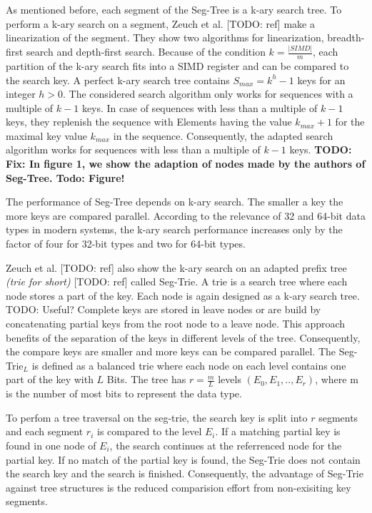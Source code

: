 \documentclass[conference]{IEEEtran}
\begin{document}
As mentioned before, each segment of the Seg-Tree is a k-ary search tree. To perform a k-ary search on a segment, Zeuch et al. [TODO: ref] make a linearization of the segment. They show two algorithms for linearization, breadth-first search and depth-first search. Because of the condition $k = \frac{\vert SIMD \vert }{m}$, each partition of the k-ary search fits into a SIMD register and can be compared to the search key. A perfect k-ary search tree contains  $S_{max} = k^h - 1$ keys for an integer $h > 0$. The considered search algorithm only works for sequences with a multiple of $k-1$ keys. In case of  sequences with less than a multiple of $k-1$ keys, they replenish the sequence with Elements having the value $k_{max} + 1$ for the maximal key value $k_{max}$ in the sequence. Consequently, the adapted search algorithm works for sequences with less than a multiple of $k-1$ keys.
\textbf{TODO: Fix: In figure 1, we show the adaption of nodes made by the authors of Seg-Tree. Todo: Figure!}

The performance of Seg-Tree depends on k-ary search. The smaller a key the more keys are compared parallel. According to the relevance of 32 and 64-bit data types in modern systems, the k-ary search performance increases only by the factor of four for 32-bit types and two for 64-bit types.

Zeuch et al. [TODO: ref] also show the k-ary search on an adapted prefix tree \emph{(trie for short)} [TODO: ref] called Seg-Trie. A trie is a search tree where each node stores a part of the key. Each node is again designed as a k-ary search tree. TODO: Useful? Complete keys are stored in leave nodes or are build by concatenating partial keys from the root node to a leave node. This approach benefits of the separation of the keys in different levels of the tree. Consequently, the compare keys are smaller and more keys can be compared parallel. The Seg-Trie$_L$ is defined as a balanced trie where each node on each level contains one part of the key with $L$ Bits. The tree has $r = \frac{m}{L}$ levels $(E_0, E_1, .., E_r)$, where m is the number of most bits to represent the data type.

To perfom a tree traversal on the seg-trie, the search key is split into $r$ segments and each segment $r_i$ is compared to the level $E_i$. If a matching partial key is found in one node of $E_i$, the search continues at the referrenced node for the partial key. If no match of the partial key is found, the Seg-Trie does not contain the search key and the search is finished. Consequently, the advantage of Seg-Trie against tree structures is the reduced comparision effort from non-exisiting key segments. 
\end{document}
